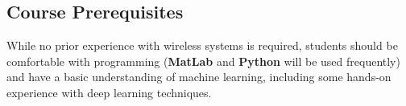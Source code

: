 
\subsection*{Course Prerequisites} 

While no prior experience with wireless systems is required, students should be comfortable with programming (\textbf{MatLab} and \textbf{Python} will be used frequently) and have a basic understanding of machine learning, including some hands-on experience with deep learning techniques.
